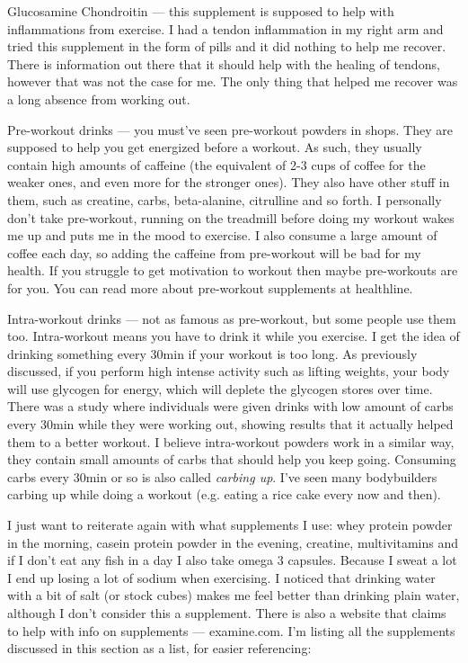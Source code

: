 \documentclass[openany, 12pt]{book}
\begin{document}
        Glucosamine Chondroitin --- this supplement is supposed to help with inflammations from exercise.
        I had a tendon inflammation in my right arm and tried this supplement in the form of pills and it did nothing to help me recover. There is information out there that it should help with
        the healing of tendons, however that was not the case for me. The only thing that helped me recover was a long absence from working out.

        Pre-workout drinks --- you must've seen pre-workout powders in shops. They are supposed to help you get energized before a workout. As such, they usually contain high amounts of caffeine
        (the equivalent of 2-3 cups of coffee for the weaker ones, and even more for the stronger ones). They also have other stuff in them, such as creatine, carbs, beta-alanine, citrulline
        and so forth. I personally don't take pre-workout, running on the treadmill
        before doing my workout wakes me up and puts me in the mood to exercise. I also consume a large amount of coffee each day, so adding the caffeine from pre-workout will be bad for my health.
        If you struggle to get motivation to workout then maybe pre-workouts are for you. You can read more about pre-workout supplements at healthline.

        Intra-workout drinks --- not as famous as pre-workout, but some people use them too. Intra-workout means you have to drink it while you exercise. I get the idea of drinking something every 30min
        if your workout is too long. As previously discussed, if you perform high intense activity such as lifting weights, your body will use glycogen for energy, which will deplete the glycogen stores
        over time. There was a study where individuals were given drinks with low amount of carbs every 30min while they were working out, showing results that it actually helped them to a better
        workout. I believe intra-workout powders work in a similar way, they contain small amounts of carbs that should help you keep going. Consuming carbs every 30min or so is also
        called \textit{carbing up}. I've seen many bodybuilders carbing up while doing a workout (e.g. eating a rice cake every now and then).

        I just want to reiterate again with what supplements I use: whey protein powder in the morning, casein protein powder in the evening, creatine, multivitamins and if I don't eat any fish
        in a day I also take omega 3 capsules. Because I sweat a lot I end up
        losing a lot of sodium when exercising. I noticed that drinking water with a bit of salt (or stock cubes) makes me feel better
        than drinking plain water, although I don't consider this a supplement. There is also a website that claims to help with info on supplements --- examine.com.
        I'm listing all the supplements discussed in this section as a list, for easier referencing:
\end{document}
